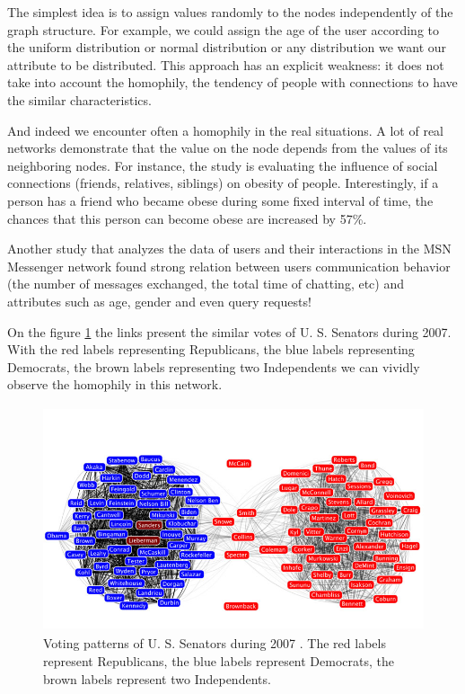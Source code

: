 \documentclass[12pt]{report}
\begin{document}
The simplest idea is to assign values randomly to the nodes independently of the graph structure. For example, we could assign the age of the user according to the uniform distribution or normal distribution or any distribution we want our attribute to be distributed. This approach has an explicit weakness: it does not take into account the homophily, the tendency of people with connections to have the similar characteristics.

And indeed we encounter often a homophily in the real situations. A lot of real networks demonstrate that the value on the node depends from the values of its neighboring nodes. For instance, the study \cite{christakis2007spread} is evaluating the influence of social connections (friends, relatives, siblings) on obesity of people. Interestingly, if a person has a friend who became obese during some fixed interval of time, the chances that this person can become obese are increased by 57\%. 

Another study \cite{singla2008yes} that analyzes the data of users and their interactions in the MSN Messenger network found strong relation between users communication behavior (the number of messages exchanged, the total time of chatting, etc) and attributes such as age, gender and even query requests!

On the figure \ref{fig:senators} the links present the similar votes of U. S. Senators during 2007. With the red labels representing Republicans, the blue labels representing Democrats, the brown labels representing two Independents we can vividly observe the homophily in this network.


\begin{figure}[t]
    \centering
    \includegraphics[height = 250px]{senate}
    \caption{ Voting patterns of U. S. Senators during 2007 \cite{Senate}. The red labels represent Republicans, the blue labels represent Democrats, the brown labels represent two Independents.}
    \label{fig:senators}
\end{figure}
\end{document}
